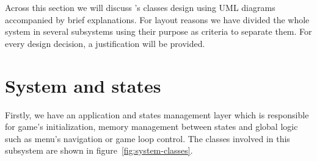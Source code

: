 
Across this section we will discuss \game's classes design using UML diagrams \cite{larm02}
accompanied by brief explanations. For layout reasons we have divided the whole
system in several subsystems using their purpose as criteria to separate them.
For every design decision, a justification will be provided.\\

\section{System and states}
\label{sec:design-system}

Firstly, we have an application and states management layer which is responsible for
game's initialization, memory management between states and global logic such as
menu's navigation or game loop control. The classes involved in this subsystem are
shown in figure~\ref{fig:system-classes}.



